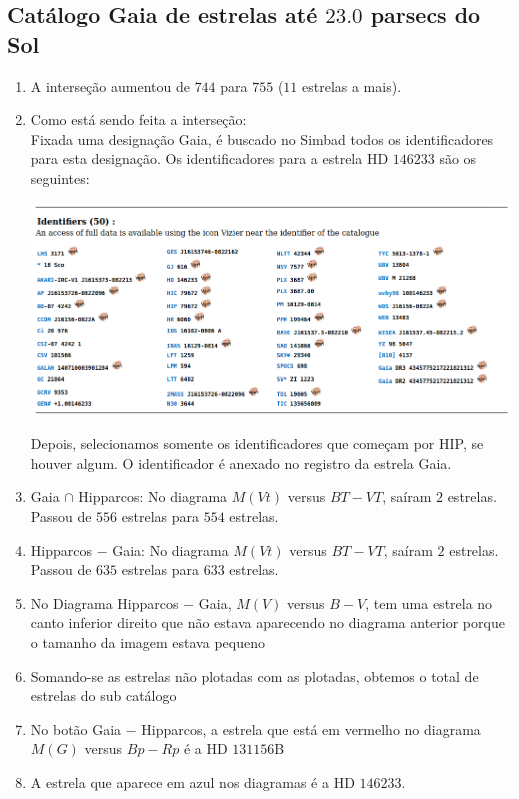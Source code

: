\documentclass{article}
\begin{document}
	\begin{center}
	\section*{\normalsize  Catálogo Gaia de estrelas até $23.0$ parsecs do Sol\\}
	\end{center}
	\vspace{50pt}

\begin{enumerate}
	\item A interseção aumentou de $744$ para $755$ ($11$ estrelas a mais).
	\item Como está sendo feita a interseção:\\
	Fixada uma designação Gaia, é buscado no Simbad todos os identificadores para esta designação. Os identificadores para a estrela HD $146233$ são os seguintes:
	
	\includegraphics[scale=0.35]{identifiers.png}
	
	Depois, selecionamos somente os identificadores que começam por HIP, se houver algum. O identificador é anexado no registro da estrela Gaia. 
	
	\item Gaia $\cap$ Hipparcos: No diagrama $M(Vt)$ versus $BT-VT$, saíram $2$ estrelas. Passou de $556$ estrelas para $554$ estrelas.
	
	\item Hipparcos $-$ Gaia: No diagrama $M(Vt)$ versus $BT-VT$, saíram $2$ estrelas. Passou de $635$ estrelas para $633$ estrelas. 
	
	\item No Diagrama Hipparcos $-$ Gaia,  $M(V)$  versus $B-V$, tem uma estrela no canto inferior direito que não estava aparecendo no diagrama anterior porque o tamanho da imagem estava pequeno
	
	\item Somando-se as estrelas não plotadas com as plotadas, obtemos o total de estrelas do sub catálogo
	
	\item No botão Gaia $-$ Hipparcos, a estrela que está em vermelho no diagrama $M(G)$ versus $Bp-Rp$ é a HD $131156$B
	
	\item A estrela que aparece em azul nos diagramas é a HD $146233$.
\end{enumerate}
\end{document}
